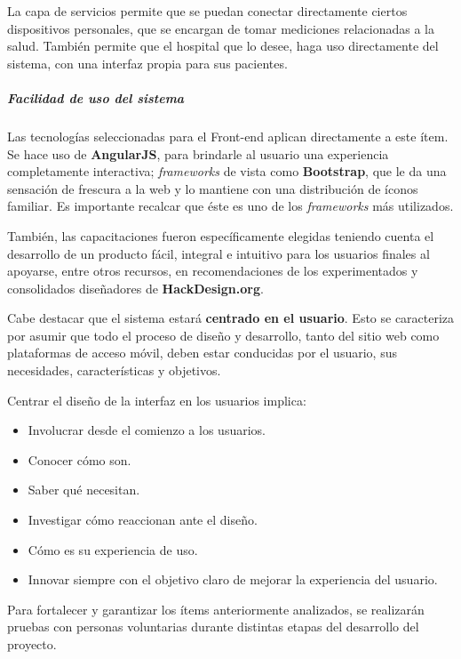    La capa de servicios permite que se puedan conectar directamente ciertos dispositivos personales, que se encargan de tomar mediciones relacionadas a la salud.
    También permite que el hospital que lo desee, haga uso directamente del sistema, con una interfaz propia para sus pacientes.
    

\subparagraph{Facilidad de uso del sistema}
    
    Las tecnologías seleccionadas para el Front-end aplican directamente a este ítem.
    Se hace uso de \textbf{AngularJS}, para brindarle al usuario una experiencia completamente interactiva; \textit{frameworks} de vista como \textbf{Bootstrap}, que le da una sensación de frescura a la web y lo mantiene con una distribución de íconos familiar.
    Es importante recalcar que éste es uno de los \textit{frameworks} más utilizados.
    
    También, las capacitaciones fueron específicamente elegidas teniendo cuenta el desarrollo de un producto fácil, integral e intuitivo para los usuarios finales al apoyarse, entre otros recursos, en recomendaciones de los experimentados y consolidados diseñadores de \textbf{HackDesign.org}.
    
    Cabe destacar que el sistema estará \textbf{centrado en el usuario}.
    Esto se caracteriza por asumir que todo el proceso de diseño y desarrollo, tanto del sitio web como plataformas de acceso móvil, deben estar conducidas por el usuario, sus necesidades, características y objetivos.

	Centrar el diseño de la interfaz en los usuarios implica:
	\begin{itemize}
		\item Involucrar desde el comienzo a los usuarios.
		\item Conocer cómo son.
		\item Saber qué necesitan.
		\item Investigar cómo reaccionan ante el diseño.
		\item Cómo es su experiencia de uso.
		\item Innovar siempre con el objetivo claro de mejorar la experiencia del usuario.
	\end{itemize}
	Para fortalecer y garantizar los ítems anteriormente analizados, se realizarán pruebas con personas voluntarias durante distintas etapas del desarrollo del proyecto.%


